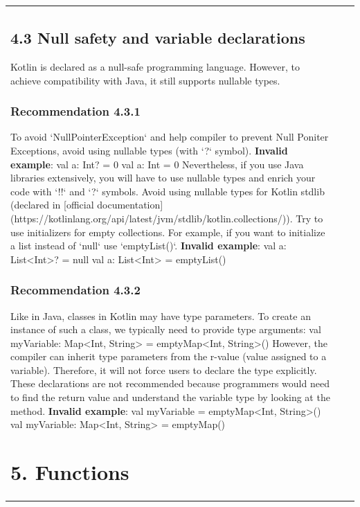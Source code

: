 \begin{center}
\begin{tabular}{ |p{}|p{}|p{}| }
{{{{{\subsection*{\textbf{4.3 Null safety and variable declarations}}
Kotlin is declared as a null-safe programming language. However, to achieve compatibility with Java, it still supports nullable types.
\subsubsection*{\textbf{Recommendation 4.3.1}}
To avoid `NullPointerException` and help compiler to prevent Null Poniter Exceptions, avoid using nullable types (with `?` symbol).
\textbf{Invalid example}:
val a: Int? = 0
val a: Int = 0
Nevertheless, if you use Java libraries extensively, you will have to use nullable types and enrich your code with `!!` and `?` symbols.
Avoid using nullable types for Kotlin stdlib (declared in [official documentation](https://kotlinlang.org/api/latest/jvm/stdlib/kotlin.collections/)).
Try to use initializers for empty collections. For example, if you want to initialize a list instead of `null` use `emptyList()`.
\textbf{Invalid example}:
val a: List<Int>? = null
val a: List<Int> = emptyList()
\subsubsection*{\textbf{Recommendation 4.3.2}}
Like in Java, classes in Kotlin may have type parameters. To create an instance of such a class, we typically need to provide type arguments:
val myVariable: Map<Int, String> = emptyMap<Int, String>()
However, the compiler can inherit type parameters from the r-value (value assigned to a variable). Therefore, it will not force users to declare the type explicitly.
These declarations are not recommended because programmers would need to find the return value and understand the variable type by looking at the method.
\textbf{Invalid example}:
val myVariable = emptyMap<Int, String>()
val myVariable: Map<Int, String> = emptyMap()
\section*{\textbf{5. Functions}}
}}}}}
\end{tabular}
\end{center}
